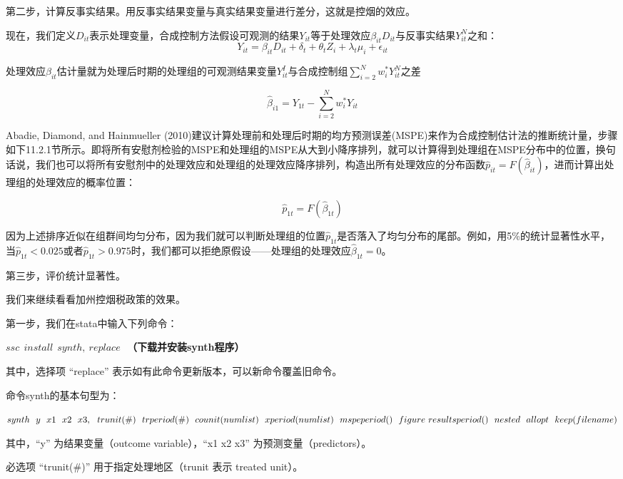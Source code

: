 \documentclass[cn,12pt,math=newtx,citestyle=gb7714-2015,bibstyle=gb7714-2015]{elegantbook}
\begin{document}
	第二步，计算反事实结果。用反事实结果变量与真实结果变量进行差分，这就是控烟的效应。
	
	现在，我们定义$D_{it}$表示处理变量，合成控制方法假设可观测的结果$Y_{it}$等于处理效应$\beta_{it}D_{it}$与反事实结果$Y_{it}^N$之和：
	\begin{equation}
		Y_{it}=\beta_{it}D_{it}+\delta_t+\theta_tZ_i+\lambda_t\mu_i+\epsilon_{it}
	\end{equation}
	
	处理效应$\beta_{it}$估计量就为处理后时期的处理组的可观测结果变量$Y_{it}^I$与合成控制组$\sum_{i=2}^N w_i^* Y_{it}^N$之差
	
	\begin{equation}
		\hat{\beta}_{i1}=Y_{1t}-\sum_{i=2}^N w_i^* Y_{it}
	\end{equation}
	
	Abadie, Diamond, and Hainmueller (2010)建议计算处理前和处理后时期的均方预测误差(MSPE)来作为合成控制估计法的推断统计量，步骤如下11.2.1节所示。即将所有安慰剂检验的MSPE和处理组的MSPE从大到小降序排列，就可以计算得到处理组在MSPE分布中的位置，换句话说，我们也可以将所有安慰剂中的处理效应和处理组的处理效应降序排列，构造出所有处理效应的分布函数$\hat{p}_{it}=F(\hat{\beta}_{it})$，进而计算出处理组的处理效应的概率位置：
	
	$$\hat{p}_{1t}=F(\hat{\beta}_{1t})$$
	
	因为上述排序近似在组群间均匀分布，因为我们就可以判断处理组的位置$\hat{p}_{1t}$是否落入了均匀分布的尾部。例如，用5\%的统计显著性水平，当$\hat{p}_{1t}<0.025或者\hat{p}_{1t}>0.975$时，我们都可以拒绝原假设——处理组的处理效应$\hat{\beta}_{1t}=0$。
	
	第三步，评价统计显著性。
	
	我们来继续看看加州控烟税政策的效果。
	
	第一步，我们在stata中输入下列命令：
	
	\textbf{$ssc~~install~~synth,~replace~~~$（下载并安装synth程序）}
	
	其中，选择项 “replace” 表示如有此命令更新版本，可以新命令覆盖旧命令。
	
	命令synth的基本句型为：
	
	\textbf{$synth~~y~~x1~~x2~~x3 ,~~trunit(\#)~~trperiod(\#)~~counit(numlist)~~xperiod(numlist)~~mspeperiod()~~figure~~\\
		resultsperiod()~~nested~~allopt~~keep(filename)$}
	
	其中，“y” 为结果变量（outcome variable），“x1 x2 x3” 为预测变量（predictors）。
	
	必选项 “trunit(\#)” 用于指定处理地区（trunit 表示 treated unit）。
	
\end{document}
